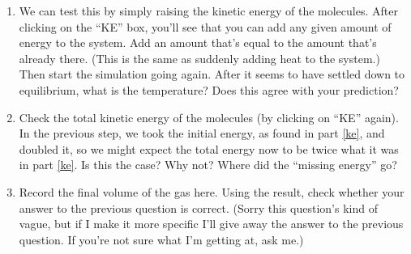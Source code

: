 \begin{enumerate}[labparts]
\answerspace{1.5in}

\item We can test this by simply raising the kinetic energy of the 
molecules.  After clicking on the ``KE'' box, you'll see that you can
add any given amount of energy to the system.  Add an amount that's
equal to the amount that's already there.  (This is the
same as suddenly adding heat to the system.) Then start the simulation going
again.  After it seems to have settled down to equilibrium, what is the
temperature?  Does this agree with your prediction?

\answerspace{1.5in}

\item Check the total kinetic energy of the molecules (by clicking on ``KE''
again).  In the previous step, we took the initial energy, as found
in part \ref{ke}, and doubled it, so we might expect the total energy
now to be twice what it was in part \ref{ke}.  Is this the case?  Why not?
Where did the ``missing energy'' go?

\answerspace{1in}

\item Record the final volume of the gas here.  Using the result, check
whether your answer to the previous question is correct.  (Sorry
this question's kind of vague, but if I make it more specific I'll
give away the answer to the previous question.  If you're not sure
what I'm getting at, ask me.)
\end{enumerate}
